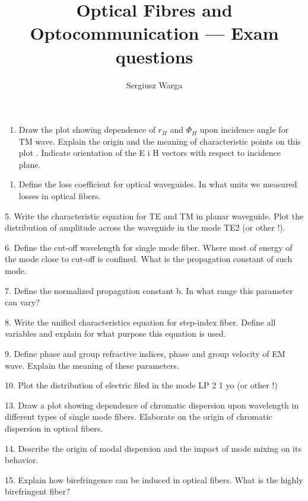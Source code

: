 \documentclass[a4paper]{article}
\title{Optical Fibres and Optocommunication --- Exam questions}
\author{Sergiusz Warga}
\begin{document}
\maketitle

\begin{enumerate}
    \item Draw the plot showing dependence of $r_H$ and $\Phi_H$ upon incidence angle for TM wave.
    Explain the origin and the  meaning of characteristic points on this plot . Indicate orientation of the E i H vectors with respect to incidence plane. 
\end{enumerate}



\begin{enumerate}
    \item Define the loss coefficient for optical waveguides. In what units we measured losses in optical fibers.  
\end{enumerate}



5.	Write the characteristic equation for TE and  TM in planar waveguide. Plot the distribution of amplitude across the waveguide  in the mode TE2  (or other !).

6.	Define the cut-off wavelength for single mode fiber. Where most of energy of the mode close to cut-off is confined. What is the propagation constant of such mode. 

7.	Define the normalized propagation constant b. In what range this parameter can vary? 

8.	Write the unified characteristics equation for step-index fiber. Define all variables and explain for what purpose this equation is  used. 

9.	Define phase and group refractive indices, phase and group velocity of  EM wave. Explain the meaning of these parameters. 

10.	Plot the distribution of electric filed in the mode LP 2 1 yo  (or other !)





13.	Draw a plot showing dependence of chromatic dispersion upon wavelength in different types of single mode fibers. Elaborate on the origin of chromatic dispersion in optical fibers.  

14.	Describe the origin of modal dispersion and the impact of mode mixing on  its behavior.

15.	Explain how birefringence can be induced in optical fibers. What is the highly birefringent fiber? 



\end{document}

